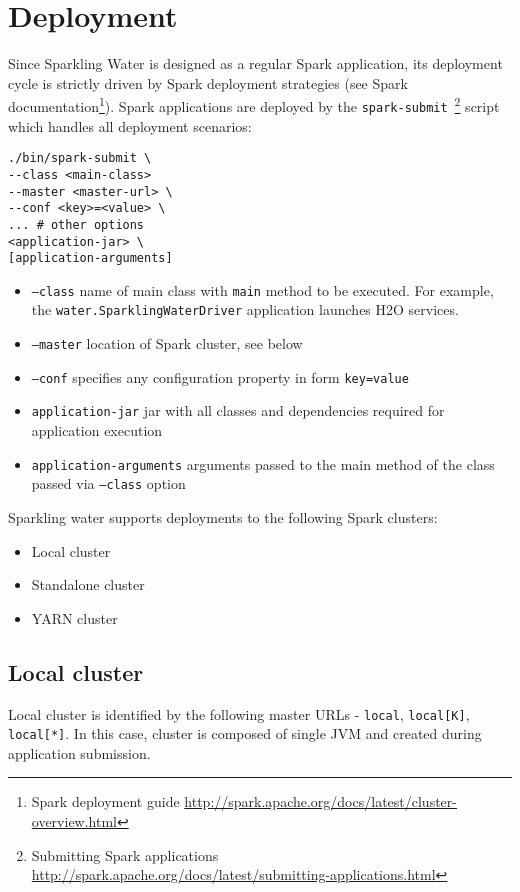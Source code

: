 \section{Deployment}
Since Sparkling Water is designed as a regular Spark application, its deployment cycle is strictly driven by Spark deployment strategies (see Spark documentation\footnote{Spark deployment guide \url{http://spark.apache.org/docs/latest/cluster-overview.html}}). Spark applications are deployed by the \texttt{spark-submit}~\footnote{Submitting Spark applications \url{http://spark.apache.org/docs/latest/submitting-applications.html}} script which handles all deployment scenarios:

\begin{lstlisting}[style=Bash]
./bin/spark-submit \
--class <main-class>
--master <master-url> \
--conf <key>=<value> \
... # other options
<application-jar> \
[application-arguments]
\end{lstlisting}

\begin{itemize}
	\item \texttt{--class} name of main class with \texttt{main} method to be executed. For example, the \texttt{water.SparklingWaterDriver} application launches H2O services.
	\item \texttt{--master} location of Spark cluster, see below
	\item \texttt{--conf} specifies any configuration property in form \texttt{key=value}
	\item \texttt{application-jar} jar with all classes and dependencies required for application execution
	\item \texttt{application-arguments} arguments passed to the main method of the class passed via \texttt{--class} option
\end{itemize}


Sparkling water supports deployments to the following Spark clusters:
\begin{itemize}
	\item{Local cluster}
	\item{Standalone cluster} 
	\item{YARN cluster}
\end{itemize}

\subsection{Local cluster}
Local cluster is identified by the following master URLs - \texttt{local}, \texttt{local[K]}, \texttt{local[*]}. In this case, cluster is composed of single JVM and created during application submission.

